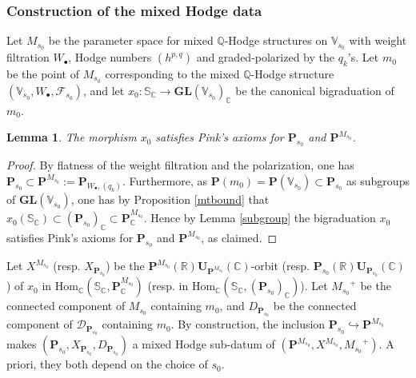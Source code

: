 \documentclass[10pt]{article}
\numberwithin{equation}{subsection}
\theoremstyle{plain}
\newtheorem{lemma}[theorem]{Lemma}
\theoremstyle{definition}
\theoremstyle{remark}
\newcommand{\Q}{\mathbb Q}
\newcommand{\C}{\mathbb C}
\newcommand{\R}{\mathbb R}
\newcommand{\V}{\mathbb V}
\newcommand{\s}{\mathbb S}
\newcommand{\pp}{\mathbf P}
\newcommand{\uu}{\mathbf U}
\newcommand{\bul}{\bullet}
\newcommand{\Hom}{\mathrm{Hom}}
\newcommand{\gl}{\mathbf{GL}}
\newcommand{\ppol}{\pp_{W_\bul, (q_k)}}
\begin{document}
\subsubsection*{Construction of the mixed Hodge data}
Let $M_{s_0}$ be the parameter space for mixed $\Q$-Hodge structures on $\V_{s_0}$ with weight filtration $W_\bul$, Hodge numbers $(h^{p,q})$ and graded-polarized by the $q_k$'s.  Let $m_0$ be the point of $M_{s_0}$ corresponding to the mixed $\Q$-Hodge structure $(\V_{s_0}, W_\bul, \mathcal{F}_{s_0})$, and let $x_0 : \s_\C \rightarrow \gl(\V_{s_0})_\C$ be the canonical bigraduation of $m_0$. 
\begin{lemma}
The morphism $x_0$ satisfies Pink's axioms for $\pp_{s_0}$ and $\pp^{M_{s_0}}$.
\end{lemma}
\begin{proof}
By flatness of the weight filtration and the polarization, one has $\pp_{s_0} \subset \pp^{M_{s_0}} := \ppol$. Furthermore, as $\pp(m_0) = \pp(\V_{s_0}) \subset \pp_{s_0}$ as subgroups of $\gl(\V_{s_0})$, one has by Proposition \ref{mtbound} that $x_0(\s_\C) \subset (\pp_{s_0})_\C \subset \pp^{M_{s_0}}_\C$. Hence by Lemma \ref{subgroup} the bigraduation $x_0$ satisfies Pink's axioms for $\pp_{s_0}$ and $\pp^{M_{s_0}}$, as claimed.
\end{proof}
 Let $X^{M_{s_0}}$ (resp. $X_{\pp_{s_0}}$) be the $\pp^{M_{s_0}}(\R)\uu_{\pp^{M_{s_0}}}(\C)$-orbit (resp. $\pp_{s_0}(\R)\uu_{\pp_{s_0}}(\C)$) of $x_0$ in $\Hom_\C(\s_\C, \pp^{M_{s_0}}_\C)$ (resp. in $\Hom_\C(\s_\C, (\pp_{s_0})_\C)$). Let ${M_{s_0}}^+$ be the connected component of ${M_{s_0}}$ containing $m_0$, and $D_{\pp_{s_0}}$ be the connected component of $\mathcal{D}_{\pp_{s_0}}$ containing $m_0$. By construction, the inclusion $\pp_{s_0} \hookrightarrow \pp^{M_{s_0}}$ makes $(\pp_{s_0}, X_{\pp_{s_0}}, D_{\pp_{s_0}})$ a mixed Hodge sub-datum of $(\pp^{M_{s_0}}, X^{M_{s_0}}, {M_{s_0}}^+)$. A priori, they both depend on the choice of $s_0$.
\end{document}
